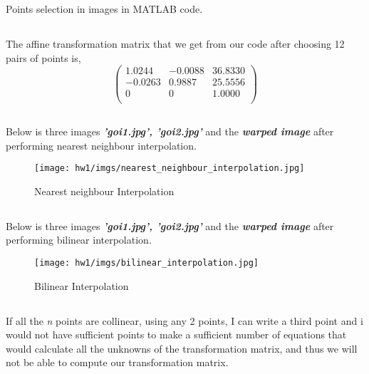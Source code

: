 \documentclass[a4paper, 11pt]{article}
\begin{document}
\newpage

\section{}
\subsection{}
    Points selection in images in MATLAB code. 
\subsection{}
    The affine transformation matrix that we get from our code after choosing 12 pairs of points is,
    \[
    \begin{pmatrix}
        
        1.0244  & -0.0088  & 36.8330\\
        -0.0263  &  0.9887   &25.5556\\
         0       &  0    &1.0000\\
    \end{pmatrix}
    \]
\subsection{}

Below is three images \textit{\textbf{'goi1.jpg', 'goi2.jpg'}} and the \textit{\textbf{warped image}} after performing nearest neighbour interpolation.
\begin{figure}[h!]
    \centering
    \texttt{[image: hw1/imgs/nearest\_neighbour\_interpolation.jpg]}
    \caption{Nearest neighbour Interpolation}
    \label{}
\end{figure}

\subsection{}
Below is three images \textit{\textbf{'goi1.jpg', 'goi2.jpg'}} and the \textit{\textbf{warped image}} after performing bilinear interpolation.

\begin{figure}[h!]
    \centering
    \texttt{[image: hw1/imgs/bilinear\_interpolation.jpg]}
    \caption{Bilinear Interpolation}
    \label{}
\end{figure}
\vspace{2cm}
\subsection{}
If all the \textit{n} points are collinear, using any 2 points, I can write a third point and i would not have sufficient points to make a sufficient number of equations that would calculate all the unknowns of the transformation matrix, and thus we will not be able to compute our transformation matrix.
\end{document}
